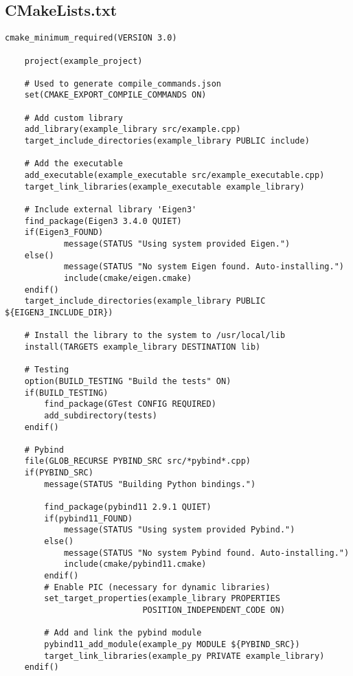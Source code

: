\subsection{CMakeLists.txt} \label{ss:main_examples/CMakeLists.txt}
\begin{lstlisting}[style=CmakeStyle]
    cmake_minimum_required(VERSION 3.0)

    project(example_project)

    # Used to generate compile_commands.json
    set(CMAKE_EXPORT_COMPILE_COMMANDS ON)

    # Add custom library
    add_library(example_library src/example.cpp)
    target_include_directories(example_library PUBLIC include)

    # Add the executable
    add_executable(example_executable src/example_executable.cpp)
    target_link_libraries(example_executable example_library)

    # Include external library 'Eigen3'
    find_package(Eigen3 3.4.0 QUIET)
    if(Eigen3_FOUND)
            message(STATUS "Using system provided Eigen.")
    else()
            message(STATUS "No system Eigen found. Auto-installing.")
            include(cmake/eigen.cmake)
    endif()
    target_include_directories(example_library PUBLIC ${EIGEN3_INCLUDE_DIR})

    # Install the library to the system to /usr/local/lib
    install(TARGETS example_library DESTINATION lib)

    # Testing
    option(BUILD_TESTING "Build the tests" ON)
    if(BUILD_TESTING)
        find_package(GTest CONFIG REQUIRED)
        add_subdirectory(tests)
    endif()

    # Pybind
    file(GLOB_RECURSE PYBIND_SRC src/*pybind*.cpp)
    if(PYBIND_SRC)
        message(STATUS "Building Python bindings.")

        find_package(pybind11 2.9.1 QUIET)
        if(pybind11_FOUND)
            message(STATUS "Using system provided Pybind.")
        else()
            message(STATUS "No system Pybind found. Auto-installing.")
            include(cmake/pybind11.cmake)
        endif()
        # Enable PIC (necessary for dynamic libraries)
        set_target_properties(example_library PROPERTIES
                            POSITION_INDEPENDENT_CODE ON)

        # Add and link the pybind module
        pybind11_add_module(example_py MODULE ${PYBIND_SRC})
        target_link_libraries(example_py PRIVATE example_library)
    endif()
\end{lstlisting}